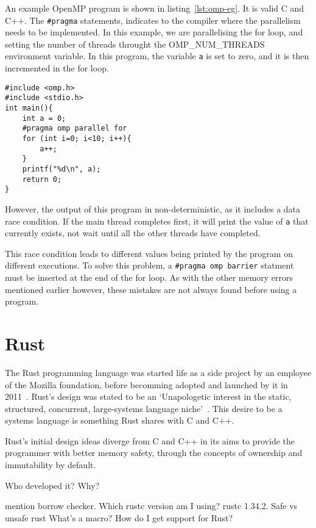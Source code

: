 An example OpenMP program is shown in listing~\ref{lst:omp-eg}. It is valid C and C++. The \texttt{\#pragma} statements, indicates to the compiler where the parallelism needs to be implemented. In this example, we are parallelising the for loop, and setting the number of threads throught the OMP\_NUM\_THREADS environment variable. In this program, the variable \texttt{a} is set to zero, and it is then incremented in the for loop.

\begin{code}
\begin{verbatim}
#include <omp.h>
#include <stdio.h>
int main(){
    int a = 0;
    #pragma omp parallel for
    for (int i=0; i<10; i++){
        a++;
    }
    printf("%d\n", a);
    return 0;
}
\end{verbatim}
\label{lst:omp-eg}
\end{code}

However, the output of this program in non-deterministic, as it includes a data race condition. If the main thread completes first, it will print the value of \texttt{a} that currently exists, not wait until all the other threads have completed. 

This race condition leads to different values being printed by the program on different executions. To solve this problem, a \texttt{\#pragma omp barrier} statment must be inserted at the end of the for loop. As with the other memory errors mentioned earlier however, these mistakes are not always found before using a program.

\section{Rust}
The Rust programming language was started life as a side project by an employee of the Mozilla foundation, before becomming adopted and launched by it in 2011~\cite{FutureTense}. Rust's design was stated to be an `Unapologetic interest in the static, structured, concurrent, large-systems language niche'~\cite{pServo}. This desire to be a systems language is something Rust shares with C and C++.

Rust's initial design ideas diverge from C and C++ in its aims to provide the programmer with better memory safety, through the concepts of ownership and immutability by default.

Who developed it? Why?

mention borrow checker. Which rustc version am I using? rustc 1.34.2. Safe vs unsafe rust
What's a macro?
How do I get support for Rust?

